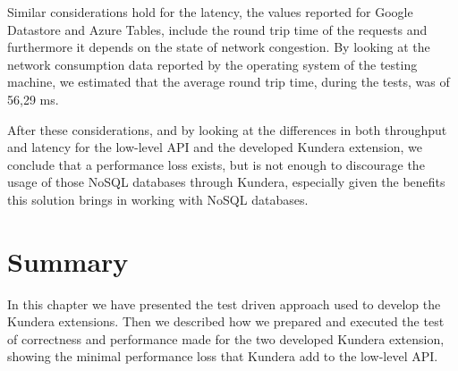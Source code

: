 \noindent Similar considerations hold for the latency, the values reported for Google Datastore and Azure Tables, include the round trip time of the requests and furthermore it depends on the state of network congestion. By looking at the network consumption data reported by the operating system of the testing machine, we estimated that the average round trip time, during the tests, was of 56,29 ms.

\newparagraph After these considerations, and by looking at the differences in both throughput and latency for the low-level API and the developed Kundera extension, we conclude that a performance loss exists, but is not enough to discourage the usage of those NoSQL databases through Kundera, especially given the benefits this solution brings in working with NoSQL databases.

\section{Summary}
In this chapter we have presented the test driven approach used to develop the Kundera extensions. Then we described how we prepared and executed the test of correctness and performance made for the two developed Kundera extension, showing the minimal performance loss that Kundera add to the low-level API.
